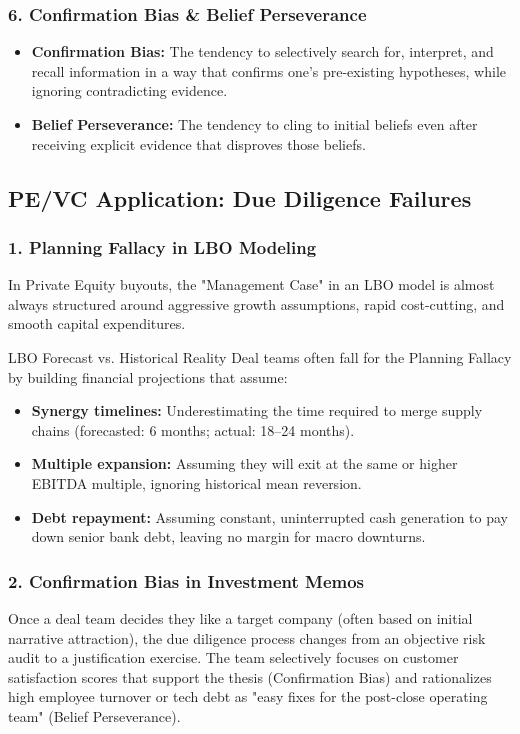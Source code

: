 \documentclass[11pt,a4paper]{article}
\begin{document}
\subsubsection{6. Confirmation Bias \& Belief Perseverance}
\begin{itemize}
    \item \textbf{Confirmation Bias:} The tendency to selectively search for, interpret, and recall information in a way that confirms one's pre-existing hypotheses, while ignoring contradicting evidence.
    \item \textbf{Belief Perseverance:} The tendency to cling to initial beliefs even after receiving explicit evidence that disproves those beliefs.
\end{itemize}

\subsection{PE/VC Application: Due Diligence Failures}

\subsubsection{1. Planning Fallacy in LBO Modeling}
In Private Equity buyouts, the "Management Case" in an LBO model is almost always structured around aggressive growth assumptions, rapid cost-cutting, and smooth capital expenditures. 

\begin{pevcbox}{LBO Forecast vs. Historical Reality}
Deal teams often fall for the Planning Fallacy by building financial projections that assume:
\begin{itemize}
    \item \textbf{Synergy timelines:} Underestimating the time required to merge supply chains (forecasted: 6 months; actual: 18--24 months).
    \item \textbf{Multiple expansion:} Assuming they will exit at the same or higher EBITDA multiple, ignoring historical mean reversion.
    \item \textbf{Debt repayment:} Assuming constant, uninterrupted cash generation to pay down senior bank debt, leaving no margin for macro downturns.
\end{itemize}
\end{pevcbox}

\subsubsection{2. Confirmation Bias in Investment Memos}
Once a deal team decides they like a target company (often based on initial narrative attraction), the due diligence process changes from an objective risk audit to a justification exercise. The team selectively focuses on customer satisfaction scores that support the thesis (Confirmation Bias) and rationalizes high employee turnover or tech debt as "easy fixes for the post-close operating team" (Belief Perseverance).
\end{document}
